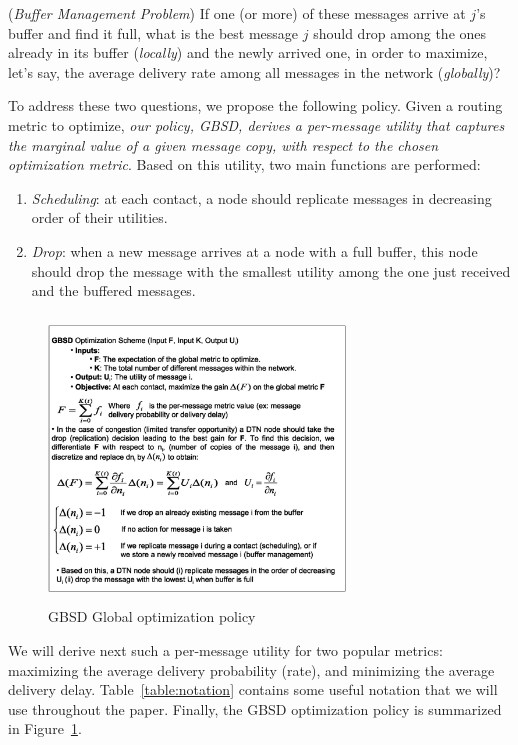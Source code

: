 (\emph{Buffer Management Problem}) If one (or more) of these messages arrive at $j$'s buffer and find it full, what is the best message $j$ should drop among the ones already in its buffer (\emph{locally}) and the newly arrived one, in order to maximize, let's say, the average delivery rate among all messages in the network (\emph{globally})?

To address these two questions, we propose the following policy. Given a routing metric to optimize, \emph{our policy, GBSD, derives a per-message utility that captures the \emph{marginal value} of a given message copy, with respect to the chosen optimization metric}. Based on this utility, two main functions are performed:

\begin{enumerate}
\item \emph{Scheduling}: at each contact, a node should replicate messages in decreasing order of their utilities.
\item \emph{Drop}: when a new message arrives at a node with a full buffer, this node should drop the message with the smallest utility among the one just received and the buffered messages.
\end{enumerate}

\begin{figure}[t]
\centering
\includegraphics[width=3.1in,height=3in]{Chapitre3/GOS.eps}
\caption{GBSD Global optimization policy}
\label{GlobalOptimizationSchema}
\end{figure}

We will derive next such a per-message utility for two popular metrics: maximizing the average delivery probability (rate), and minimizing the average delivery delay. Table~\ref{table:notation} contains some useful notation that we will use throughout the paper. Finally, the GBSD optimization policy is summarized in Figure~\ref{GlobalOptimizationSchema}.

